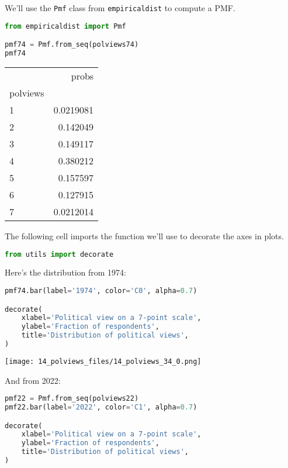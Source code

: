 We'll use the \passthrough{\lstinline!Pmf!} class from
\passthrough{\lstinline!empiricaldist!} to compute a PMF.

\begin{lstlisting}[language=Python,style=source]
from empiricaldist import Pmf

pmf74 = Pmf.from_seq(polviews74)
pmf74
\end{lstlisting}

\begin{tabular}{lr}
\toprule
 & probs \\
polviews &  \\
\midrule
1 & 0.0219081 \\
2 & 0.142049 \\
3 & 0.149117 \\
4 & 0.380212 \\
5 & 0.157597 \\
6 & 0.127915 \\
7 & 0.0212014 \\
\bottomrule
\end{tabular}

The following cell imports the function we'll use to decorate the axes
in plots.

\begin{lstlisting}[language=Python,style=source]
from utils import decorate
\end{lstlisting}

Here's the distribution from 1974:

\begin{lstlisting}[language=Python,style=source]
pmf74.bar(label='1974', color='C0', alpha=0.7)

decorate(
    xlabel='Political view on a 7-point scale',
    ylabel='Fraction of respondents',
    title='Distribution of political views',
)
\end{lstlisting}

\begin{center}
\texttt{[image: 14\_polviews\_files/14\_polviews\_34\_0.png]}
\end{center}

And from 2022:

\begin{lstlisting}[language=Python,style=source]
pmf22 = Pmf.from_seq(polviews22)
pmf22.bar(label='2022', color='C1', alpha=0.7)

decorate(
    xlabel='Political view on a 7-point scale',
    ylabel='Fraction of respondents',
    title='Distribution of political views',
)
\end{lstlisting}

